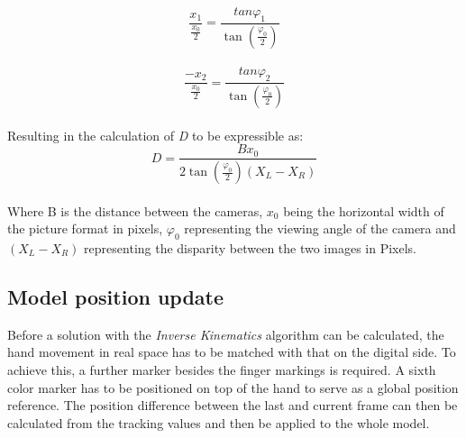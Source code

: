 \begin{equation}
\frac{x_{1}}{\frac{x_{0}}{2}}=\frac{tan \varphi_1}{\tan(\frac{\varphi_{0}}{2})}
\end{equation}\\
\begin{equation}
\frac{-x_{2}}{\frac{x_{0}}{2}}=\frac{tan \varphi_2}{\tan(\frac{\varphi_{0}}{2})}
\end{equation}\\
Resulting in the calculation of \textit{D} to be expressible as:
\begin{equation}
D=\frac{Bx_0}{2\tan(\frac{\varphi_0}{2})(X_{L}-X_{R})}
\end{equation}\\
Where B is the distance between the cameras, $x_0$ being the horizontal width of the picture format in pixels, $\varphi_0$ representing the viewing angle of the camera and $(X_{L}-X_{R})$ representing the disparity between the two images in Pixels.
\subsection{Model position update}
Before a solution with the \textit{Inverse Kinematics} algorithm can be calculated, the hand movement in real space has to be matched with that on the digital side. To achieve this, a further marker besides the finger markings is required. A sixth color marker has to be positioned on top of the hand to serve as a global position reference. The position difference between the last and current frame can then be calculated from the tracking values and then be applied to the whole model.
